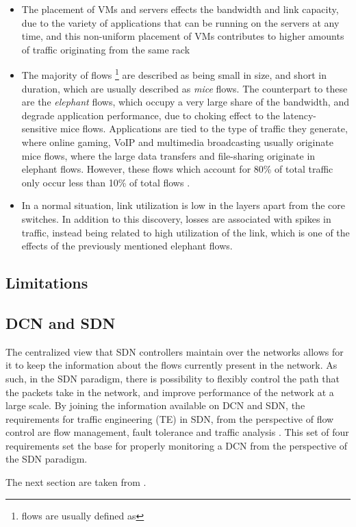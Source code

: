 \begin {itemize}
    \item The placement of VMs and servers effects the bandwidth and link capacity, due to the variety of applications that can be running on the servers at any time, and this non-uniform placement of VMs contributes to higher
        amounts of traffic originating from the same rack
    \item The majority of flows \footnote {flows are usually defined as} are described as being small in size, and short in duration, which are usually described as \textit {mice} flows. The counterpart to these are the 
        \textit {elephant} flows, which occupy a very large share of the bandwidth, and degrade application performance, due to choking effect to the latency-sensitive mice flows. Applications are tied to the type of traffic they
        generate, where online gaming, VoIP and multimedia broadcasting usually originate mice flows, where the large data transfers and file-sharing originate in elephant flows. However, these flows which account for 80\% of 
        total traffic only occur less than 10\% of total flows \cite {CITE - Broadcom Engineered Elephant flow for boosting ... }.
    \item In a normal situation, link utilization is low in the layers apart from the core switches. In addition to this discovery, losses are associated with spikes in traffic, instead being related to high utilization 
        of the link, which is one of the effects of the previously mentioned elephant flows.
\end {itemize}

\subsection {Limitations}

\subsection {DCN and SDN}

\par The centralized view that SDN controllers maintain over the networks allows for it to keep the information about the flows currently present in the network. As such, in the SDN paradigm, there is possibility to flexibly control 
the path that the packets take in the network, and improve performance of the network at a large scale. By joining the information available on DCN and SDN, the requirements for traffic engineering (TE) in SDN, from
the perspective of flow control are flow management, fault tolerance and traffic analysis \cite { CITE - traffic_engineering_sdn}. This set of four requirements set the base for properly monitoring a DCN from the 
perspective of the SDN paradigm.
\par The next section are taken from \cite { CITE - traffic_engineering_sdn}.

